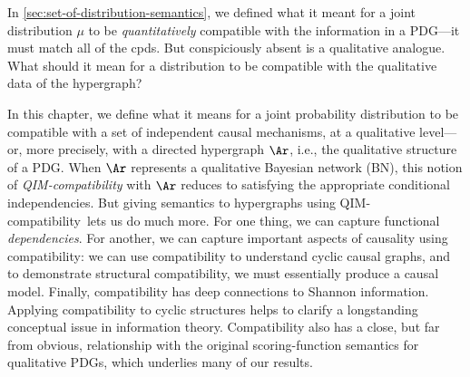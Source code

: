 \newcommand\dotmodels{\mathbin{{\models}^{\mathllap{\bullet\,}}_{\vphantom{l}}}}
\newcommand\emodels{\mathbin{{\models}^{\mathllap{e\,}}_{\vphantom{l}}}}

\newcommand\PSEMs{\mathrm{PSEMs}}
\newcommand\PSEMsA{\mathrm{PSEMs}_{\!\Ar}}
\newcommand\Wits{\mathrm{Wits}}

\newcommand\U{\mathcal U}
\newcommand\enV{\mathcal V} %
\newcommand\muxor{\mu_{\mathit{xor}}}

\newcommand\hyperarc{hyperarc}
\newcommand\arc{hyperarc}
\newcommand\SQIM{QIM}%
\newcommand\scibility{\SQIM-compatibility}
\newcommand\Scibility{\SQIM-compatibility}
\newcommand\SCibility{\SQIM-Compatibility}

\newcommand\scible{\SQIM-compatible}
\newcommand\escible{E\scible}
\newcommand\cible{compatible}
\newcommand\cibility{compatibility}

\newcommand\partl{partitional}
\newcommand\subpartl{sub\partl}
\newcommand\unipartl{uni\partl}
\newcommand\suppartl{super\partl}
\newcommand\suppartlness{\suppartl ity}

\newcommand\hgraph{hypergraph}


In \cref{sec:set-of-distribution-semantics}, we defined what it meant
for a joint distribution $\mu$ to be \emph{quantitatively} compatible with the information in a PDG---it must match all of the cpds. 
But conspiciously absent is a qualitative analogue. 
What should it mean for a distribution to be compatible with the qualitative data of the hypergraph?


In this chapter, we define what it means for a joint probability distribution to be 
compatible
with a set of independent causal mechanisms,
at a qualitative level---%
or, more precisely, with a directed hypergraph $\Ar$,
i.e., the qualitative structure of a PDG. 
When $\Ar$ represents a qualitative Bayesian network (BN), 
this notion of \emph{\scibility} with $\Ar$
reduces to satisfying the appropriate conditional independencies. 
But giving semantics to hypergraphs using \scibility\ lets us do much more.
For one thing, we can capture functional \emph{dependencies}.
For another, we can capture important aspects of causality using compatibility:
we can use compatibility to understand cyclic causal graphs, and
to demonstrate structural compatibility, we must 
essentially produce a causal model. 
Finally, compatibility has deep connections to 
Shannon information.
Applying compatibility to cyclic structures helps to clarify a
longstanding conceptual issue 
in information theory.
Compatibility also has a close, but far from obvious,
relationship with the original scoring-function semantics for
qualitative PDGs, 
which underlies many of our results.


